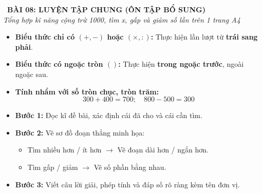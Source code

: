\documentclass[12pt,a4paper]{article}
\begin{document}
\begin{tcolorbox}[
  enhanced,
  colback=teal!8!white,
  colframe=teal!70!black,
  arc=3mm, boxrule=1.2pt,
  left=3mm, right=3mm, top=2mm, bottom=2mm,
  halign=center
]
  {\LARGE\bfseries\color{teal!90!black}\faBookmark\ BÀI 08: LUYỆN TẬP CHUNG (ÔN TẬP BỔ SUNG)}\\[1mm]
  {\itshape\footnotesize\color{black!75} Tổng hợp kĩ năng cộng trừ 1000, tìm x, gấp và giảm số lần trên 1 trang A4}
\end{tcolorbox}

\vspace{-2mm}

\noindent
\begin{minipage}[t]{0.49\textwidth}\vspace{0pt}
\begin{tcolorbox}[
  enhanced,
  colback=blue!4!white,
  colframe=blue!75!black,
  arc=2mm, boxrule=0.8pt,
  left=2mm, right=2mm, top=1.8mm, bottom=1.8mm,
  title={\footnotesize\bfseries\color{white}\faCalculator\ 1. Tính toán \& Thứ tự phép tính}
]
{\footnotesize
\begin{itemize}\setlength{\itemsep}{1pt}\setlength{\leftskip}{-2.5mm}
  \item \textbf{Biểu thức chỉ có $(+, -)$ hoặc $(\times, :)$:} Thực hiện lần lượt từ \textbf{trái sang phải}.
  \item \textbf{Biểu thức có ngoặc tròn $( )$:} Thực hiện \textbf{trong ngoặc trước}, ngoài ngoặc sau.
  \item \textbf{Tính nhẩm với số tròn chục, tròn trăm:}
  $$300 + 400 = 700;\quad 800 - 500 = 300$$
\end{itemize}
}
\end{tcolorbox}
\end{minipage}
\hfill
\begin{minipage}[t]{0.49\textwidth}\vspace{0pt}
\begin{tcolorbox}[
  enhanced,
  colback=teal!4!white,
  colframe=teal!75!black,
  arc=2mm, boxrule=0.8pt,
  left=2mm, right=2mm, top=1.8mm, bottom=1.8mm,
  title={\footnotesize\bfseries\color{white}\faCheckSquare\ 2. Cẩm nang giải toán có lời văn}
]
{\footnotesize
\begin{itemize}\setlength{\itemsep}{1pt}\setlength{\leftskip}{-2.5mm}
  \item \textbf{Bước 1:} Đọc kĩ đề bài, xác định cái đã cho và cái cần tìm.
  \item \textbf{Bước 2:} Vẽ sơ đồ đoạn thẳng minh họa:
  \begin{itemize}\setlength{\itemsep}{0.5pt}\setlength{\leftskip}{-2.5mm}
    \item Tìm nhiều hơn / ít hơn $\to$ Vẽ đoạn dài hơn / ngắn hơn.
    \item Tìm gấp / giảm $\to$ Vẽ số phần bằng nhau.
  \end{itemize}
  \item \textbf{Bước 3:} Viết câu lời giải, phép tính và đáp số rõ ràng kèm tên đơn vị.
\end{itemize}
}
\end{tcolorbox}
\end{minipage}
\end{document}
